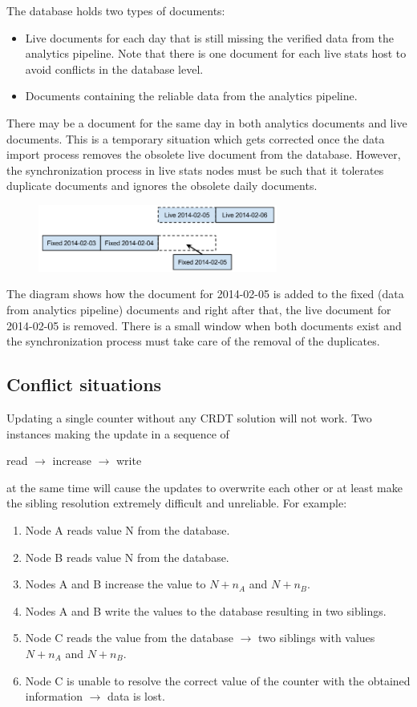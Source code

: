 \documentclass[11pt,a4paper]{report}
\begin{document}
The database holds two types of documents:
\begin{itemize}
	\item Live documents for each day that is still missing the verified data from the analytics pipeline. Note that there is one document for each live stats host to avoid conflicts in the database level.
	\item Documents containing the reliable data from the analytics pipeline.
\end{itemize}

There may be a document for the same day in both analytics documents and live documents. This is a temporary situation which gets corrected once the data import process removes the obsolete live document from the database. However, the synchronization process in live stats nodes must be such that it tolerates duplicate documents and ignores the obsolete daily documents.

\begin{figure}[!h]
	\centering
	\includegraphics[width=0.7\textwidth]{./img/image2.png}
\end{figure}

The diagram shows how the document for 2014-02-05 is added to the fixed (data from analytics pipeline) documents and right after that, the live document for 2014-02-05 is removed. There is a small window when both documents exist and the synchronization process must take care of the removal of the duplicates.

\subsection{Conflict situations}
Updating a single counter without any CRDT solution will not work. Two instances making the update in a sequence of 
\begin{center}
read $\rightarrow$ increase $\rightarrow$ write 
\end{center}

at the same time will cause the updates to overwrite each other or at least make the sibling resolution extremely difficult and unreliable.
For example:
\begin{enumerate}
\item Node A reads value N from the database.
\item Node B reads value N from the database. 
\item Nodes A and B increase the value to $N+n_A$ and $N+n_B$. 
\item Nodes A and B write the values to the database resulting in two siblings. 
\item Node C reads the value from the database $\rightarrow$ two siblings with values $N+n_A$ and $N+n_B$. 
\item Node C is unable to resolve the correct value of the counter with the obtained information $\rightarrow$ data is lost.
\end{enumerate}
\end{document}
